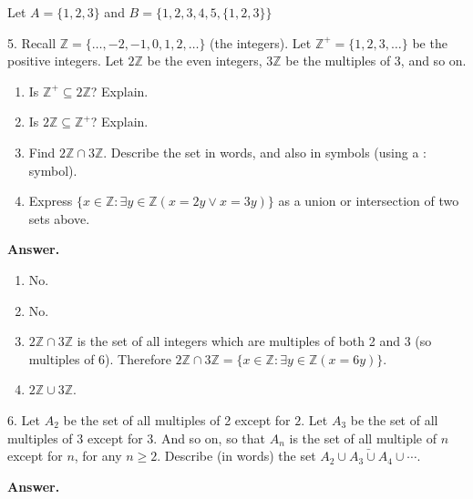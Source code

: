 \documentclass[10pt,]{book}
\theoremstyle{plain}
\theoremstyle{definition}
\theoremstyle{definition}
\theoremstyle{definition}
\numberwithin{equation}{section}
\def\Z{\mathbb Z}
\def\st{:}
\begin{document}
\begin{exerciselist}
            Let \(A = \{1,2,3\}\) and \(B = \{1,2,3,4,5,\{1,2,3\}\}\)
\item[5.]\hypertarget{exercise-5}{}
            Recall \(\Z = \{\ldots,-2,-1,0, 1,2,\ldots\}\) (the integers). Let \(\Z^+ = \{1, 2, 3, \ldots\}\) be the positive integers. Let \(2\Z\) be the even integers, \(3\Z\) be the multiples of 3, and so on.
\leavevmode%
\begin{enumerate}[label=(\alph*)]
\item\hypertarget{li-88}{}
                Is \(\Z^+ \subseteq 2\Z\)? Explain.
\item\hypertarget{li-89}{}
                Is \(2\Z \subseteq \Z^+\)? Explain.
\item\hypertarget{li-90}{}
                Find \(2\Z \cap 3\Z\). Describe the set in words, and also in symbols (using a \(\st\) symbol).
\item\hypertarget{li-91}{}
                Express \(\{x \in \Z \st \exists y\in \Z (x = 2y \vee x = 3y)\}\) as a union or intersection of two sets above.
\end{enumerate}
\par\smallskip
\par\smallskip
\noindent\textbf{Answer.}\hypertarget{answer-5}{}\quad
\leavevmode%
\begin{enumerate}[label=(\alph*)]
\item\hypertarget{li-92}{}
                No.
\item\hypertarget{li-93}{}
                No.
\item\hypertarget{li-94}{}\(2\Z \cap 3\Z\) is the set of all integers which are multiples of both 2 and 3 (so multiples of 6). Therefore \(2\Z \cap 3\Z = \{x \in \Z \st \exists y\in \Z(x = 6y)\}\).\item\hypertarget{li-95}{}\(2\Z \cup 3\Z\).\end{enumerate}
\item[6.]\hypertarget{exercise-6}{}
            Let \(A_2\) be the set of all multiples of 2 except for \(2\). Let \(A_3\) be the set of all multiples of 3 except for 3. And so on, so that \(A_n\) is the set of all multiple of \(n\) except for \(n\), for any \(n \ge 2\).
            Describe (in words) the set \(\bar{A_2 \cup A_3 \cup A_4 \cup \cdots}\).
\par\smallskip
\par\smallskip
\noindent\textbf{Answer.}\hypertarget{answer-6}{}\quad


\end{exerciselist}
\end{document}

